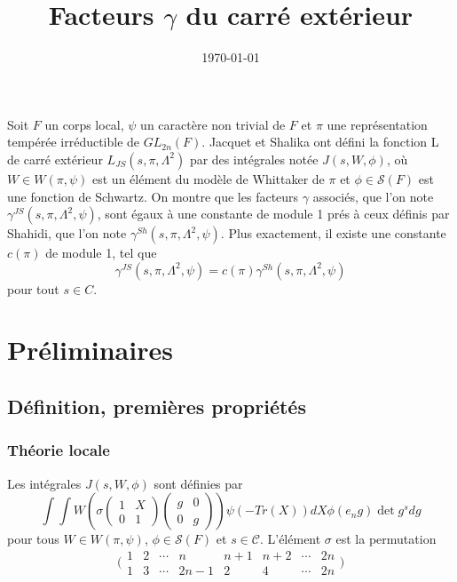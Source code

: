 \documentclass{amsart}
\begin{document}
\title{Facteurs $\gamma$ du carré extérieur}
\date{\today}
\maketitle

Soit $F$ un corps local, $\psi$ un caractère non trivial de $F$ et $\pi$ une représentation tempérée irréductible de $GL_{2n}(F)$. Jacquet et Shalika ont défini la fonction L de carré extérieur $L_{JS}(s, \pi, \Lambda^2)$ par des intégrales notée $J(s, W, \phi)$, où $W \in W(\pi, \psi)$ est un élément du modèle de Whittaker de $\pi$ et $\phi \in \mathcal{S}(F)$ est une fonction de Schwartz. On montre que les facteurs $\gamma$ associés, que l'on note $\gamma^{JS}(s,\pi,\Lambda^2,\psi)$, sont égaux à une constante de module 1 prés à ceux définis par Shahidi, que l'on note $\gamma^{Sh}(s,\pi,\Lambda^2,\psi)$. Plus exactement, il existe une constante $c(\pi)$ de module 1, tel que
$$\gamma^{JS}(s,\pi,\Lambda^2,\psi)=c(\pi)\gamma^{Sh}(s,\pi,\Lambda^2,\psi)$$
pour tout $s \in C$.

\section{Préliminaires}

\subsection{Définition, premières propriétés}

\subsubsection{Théorie locale}
Les intégrales $J(s, W, \phi)$ sont définies par
$$\int \int W\left(\sigma \begin{pmatrix}
1 & X \\
0 & 1
\end{pmatrix}\begin{pmatrix}
g & 0 \\
0 & g
\end{pmatrix}\right)\psi(-Tr(X))dX\phi(e_ng)\det g^s dg$$
pour tous $W \in W(\pi, \psi)$, $\phi \in \mathcal{S}(F)$ et $s \in \mathcal{C}$. L'élément $\sigma$ est la permutation
$$\bigl(\begin{smallmatrix}
    1 & 2 & \cdots & n & n+1 & n+2 & \cdots & 2n \\
    1 & 3 & \cdots &  2n-1  & 2 & 4 & \cdots & 2n
  \end{smallmatrix}\bigr)$$
  
\end{document}

